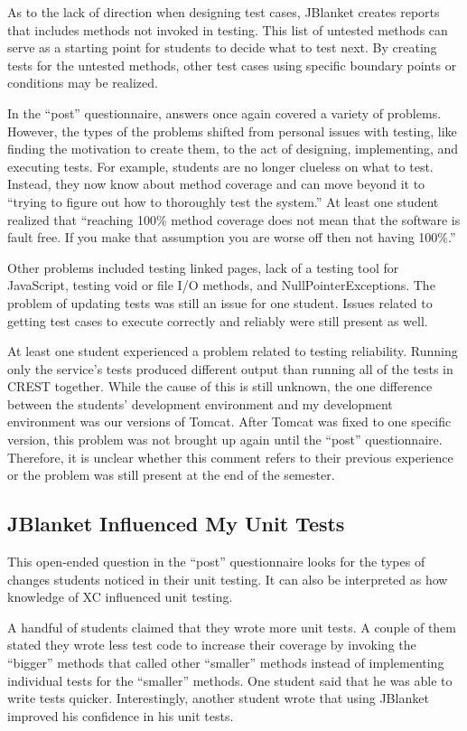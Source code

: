 As to the lack of direction when designing test cases, JBlanket creates
reports that includes methods not invoked in testing.  This list of
untested methods can serve as a starting point for students to decide what
to test next.  By creating tests for the untested methods, other test cases
using specific boundary points or conditions may be realized.

In the ``post'' questionnaire, answers once again covered a variety of
problems.  However, the types of the problems shifted from personal issues
with testing, like finding the motivation to create them, to the act of
designing, implementing, and executing tests.  For example, students are no
longer clueless on what to test.  Instead, they now know about method
coverage and can move beyond it to ``trying to figure out how to thoroughly
test the system.''  At least one student realized that ``reaching 100\%
method coverage does not mean that the software is fault free.  If you make
that assumption you are worse off then not having 100\%.''

Other problems included testing linked pages, lack of a testing tool for
JavaScript, testing void or file I/O methods, and NullPointerExceptions.
The problem of updating tests was still an issue for one student.  Issues
related to getting test cases to execute correctly and reliably were still
present as well.

At least one student experienced a problem related to testing reliability.
Running only the service's tests produced different output than running all
of the tests in CREST together.  While the cause of this is still unknown,
the one difference between the students' development environment and my
development environment was our versions of Tomcat.  After Tomcat was fixed
to one specific version, this problem was not brought up again until the
``post'' questionnaire.  Therefore, it is unclear whether this comment
refers to their previous experience or the problem was still present at the
end of the semester.

\subsection{JBlanket Influenced My Unit Tests}
This open-ended question in the ``post'' questionnaire looks for the types
of changes students noticed in their unit testing.  It can also be
interpreted as how knowledge of XC influenced unit testing.

A handful of students claimed that they wrote more unit tests.  A couple of
them stated they wrote less test code to increase their coverage by
invoking the ``bigger'' methods that called other ``smaller'' methods
instead of implementing individual tests for the ``smaller'' methods.  One
student said that he was able to write tests quicker.  Interestingly,
another student wrote that using JBlanket improved his confidence in his
unit tests.


